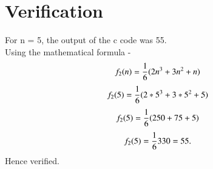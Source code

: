 \documentclass[journal,12pt,twocolumn]{IEEEtran}
\begin{document}
\section{Verification} 
For n = 5, the output of the c code was 55.\\
Using the mathematical formula -
\begin{equation}
f_2(n) = \frac{1}{6} (2n\textsuperscript{3} + 3n\textsuperscript{2} + n)
\end{equation}
\begin{equation}
f_2(5) = \frac{1}{6} (2*5\textsuperscript{3} + 3*5\textsuperscript{2} + 5) \\
\end{equation}
\begin{equation}
f_2(5) = \frac{1}{6} (250 + 75 +5) \\
\end{equation}
\begin{equation}
f_2(5) = \frac{1}{6} 330 = 55.\\
\end{equation}
Hence verified.
\end{document}
